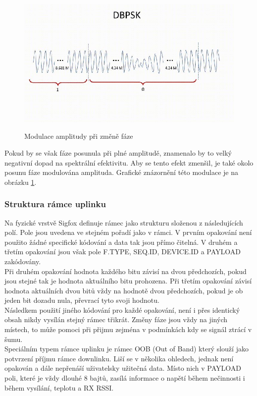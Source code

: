 \documentclass{ctuthesis}
\begin{document}
\begin{figure}
\caption{Modulace amplitudy při změně fáze \cite{sigfoxprotocol}}
\includegraphics[width=1\textwidth]{./images/dbpsk_sigfox.jpg}
\label{dbpsk_sigfox}
\end{figure}
Pokud by se však fáze posunula při plné amplitudě, znamenalo by to velký negativní dopad na spektrální efektivitu. Aby se tento efekt zmenšil, je také okolo posunu fáze modulována amplituda. Grafické znázornění této modulace je na obrázku \ref{dbpsk_sigfox}.\\

\subsubsection{Struktura rámce uplinku}
Na fyzické vrstvě Sigfox definuje rámec jako strukturu složenou z následujících polí. Pole jsou uvedena ve stejném pořadí jako v rámci. V prvním opakování není použito žádné specifické kódování a data tak jsou přímo čitelná. V druhém a třetím opakování jsou však pole F.TYPE, SEQ.ID, DEVICE.ID a PAYLOAD zakódovány.\\
Při druhém opakování hodnota každého bitu závisí na dvou předchozích, pokud jsou stejné tak je hodnota aktuálního bitu prohozena. Při třetím opakování závisí hodnota aktuálních dvou bitů vždy na hodnotě dvou předchozích, pokud je ob jeden bit dozadu nula, převrací tyto svoji hodnotu.\\
Následkem použití jiného kódování pro každé opakování, není i přes identický obsah nikdy vysílán stejný rámec třikrát. Změny fáze jsou vždy na jiných místech, to může pomoci při přijmu zejména v podmínkách kdy se signál ztrácí v šumu.\\
Speciálním typem rámce uplinku je rámec OOB (Out of Band) který slouží jako potvrzení příjmu rámce downlinku. Liší se v několika ohledech, jednak není opakován a dále nepřenáší uživatelsky užitečná data. Místo nich v PAYLOAD poli, které je vždy dlouhé 8 bajtů, zasílá informace o napětí během nečinnosti i během vysílání, teplotu a RX RSSI.
\end{document}
